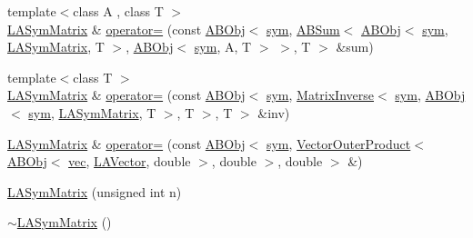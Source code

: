 \begin{DoxyCompactItemize}
\item 
{\footnotesize template$<$class A , class T $>$ }\\\mbox{\hyperlink{classROOT_1_1Minuit2_1_1LASymMatrix}{L\+A\+Sym\+Matrix}} \& \mbox{\hyperlink{classROOT_1_1Minuit2_1_1LASymMatrix_abaf8a2feeb04c66aca17e5876dd7aaff}{operator=}} (const \mbox{\hyperlink{classROOT_1_1Minuit2_1_1ABObj}{A\+B\+Obj}}$<$ \mbox{\hyperlink{classROOT_1_1Minuit2_1_1sym}{sym}}, \mbox{\hyperlink{classROOT_1_1Minuit2_1_1ABSum}{A\+B\+Sum}}$<$ \mbox{\hyperlink{classROOT_1_1Minuit2_1_1ABObj}{A\+B\+Obj}}$<$ \mbox{\hyperlink{classROOT_1_1Minuit2_1_1sym}{sym}}, \mbox{\hyperlink{classROOT_1_1Minuit2_1_1LASymMatrix}{L\+A\+Sym\+Matrix}}, T $>$, \mbox{\hyperlink{classROOT_1_1Minuit2_1_1ABObj}{A\+B\+Obj}}$<$ \mbox{\hyperlink{classROOT_1_1Minuit2_1_1sym}{sym}}, A, T $>$ $>$, T $>$ \&sum)
\item 
{\footnotesize template$<$class T $>$ }\\\mbox{\hyperlink{classROOT_1_1Minuit2_1_1LASymMatrix}{L\+A\+Sym\+Matrix}} \& \mbox{\hyperlink{classROOT_1_1Minuit2_1_1LASymMatrix_a95fd77b55f726095a231817852fceb7d}{operator=}} (const \mbox{\hyperlink{classROOT_1_1Minuit2_1_1ABObj}{A\+B\+Obj}}$<$ \mbox{\hyperlink{classROOT_1_1Minuit2_1_1sym}{sym}}, \mbox{\hyperlink{classROOT_1_1Minuit2_1_1MatrixInverse}{Matrix\+Inverse}}$<$ \mbox{\hyperlink{classROOT_1_1Minuit2_1_1sym}{sym}}, \mbox{\hyperlink{classROOT_1_1Minuit2_1_1ABObj}{A\+B\+Obj}}$<$ \mbox{\hyperlink{classROOT_1_1Minuit2_1_1sym}{sym}}, \mbox{\hyperlink{classROOT_1_1Minuit2_1_1LASymMatrix}{L\+A\+Sym\+Matrix}}, T $>$, T $>$, T $>$ \&inv)
\item 
\mbox{\hyperlink{classROOT_1_1Minuit2_1_1LASymMatrix}{L\+A\+Sym\+Matrix}} \& \mbox{\hyperlink{classROOT_1_1Minuit2_1_1LASymMatrix_a6d385d24fe98b336532837ad39f5c615}{operator=}} (const \mbox{\hyperlink{classROOT_1_1Minuit2_1_1ABObj}{A\+B\+Obj}}$<$ \mbox{\hyperlink{classROOT_1_1Minuit2_1_1sym}{sym}}, \mbox{\hyperlink{classROOT_1_1Minuit2_1_1VectorOuterProduct}{Vector\+Outer\+Product}}$<$ \mbox{\hyperlink{classROOT_1_1Minuit2_1_1ABObj}{A\+B\+Obj}}$<$ \mbox{\hyperlink{classROOT_1_1Minuit2_1_1vec}{vec}}, \mbox{\hyperlink{classROOT_1_1Minuit2_1_1LAVector}{L\+A\+Vector}}, double $>$, double $>$, double $>$ \&)
\item 
\mbox{\hyperlink{classROOT_1_1Minuit2_1_1LASymMatrix_a9fe58788095d0860bb44bde53457782c}{L\+A\+Sym\+Matrix}} (unsigned int n)
\item 
\mbox{\hyperlink{classROOT_1_1Minuit2_1_1LASymMatrix_a6de4c2f5940002a13411348985d1b784}{$\sim$\+L\+A\+Sym\+Matrix}} ()

\end{DoxyCompactItemize}
